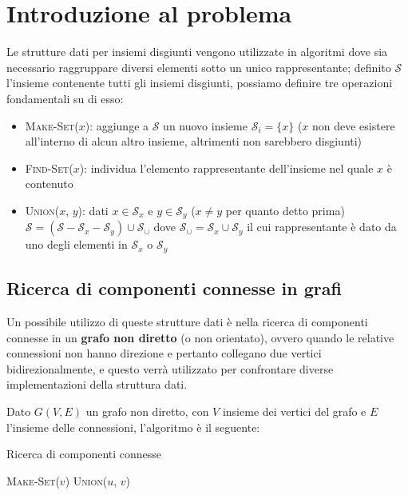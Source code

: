 \section{Introduzione al problema}

Le strutture dati per insiemi disgiunti vengono utilizzate in algoritmi
dove sia necessario raggruppare diversi elementi sotto un unico rappresentante;
definito $\mathcal{S}$ l'insieme contenente tutti gli insiemi disgiunti,
possiamo definire tre operazioni fondamentali su di esso:

\begin{itemize}
    \item \textsc{Make-Set($x$)}: aggiunge a $\mathcal{S}$ un nuovo insieme
          $\mathcal{S}_i = \{x\}$ ($x$ non deve esistere all'interno di alcun altro insieme,
          altrimenti non sarebbero disgiunti)
    \item \textsc{Find-Set($x$)}: individua l'elemento rappresentante dell'insieme nel quale $x$ è contenuto
    \item \textsc{Union($x$, $y$)}: dati $x \in \mathcal{S}_x$ e $y \in \mathcal{S}_y$
          ($x \ne y$ per quanto detto prima) $\mathcal{S} = (\mathcal{S} - \mathcal{S}_x - \mathcal{S}_y) \cup \mathcal{S}_\cup$
          dove $\mathcal{S}_\cup = \mathcal{S}_x \cup \mathcal{S}_y$ il cui rappresentante è
          dato da uno degli elementi in $\mathcal{S}_x$ o $\mathcal{S}_y$
\end{itemize}

\subsection{Ricerca di componenti connesse in grafi}

Un possibile utilizzo di queste strutture dati è nella ricerca di componenti
connesse in un \textbf{grafo non diretto} (o non orientato), ovvero quando le relative
connessioni non hanno direzione e pertanto collegano due vertici bidirezionalmente,
e questo verrà utilizzato per confrontare diverse implementazioni della
struttura dati.\newline

Dato $G(V,E)$ un grafo non diretto, con $V$ insieme dei vertici del grafo e $E$
l'insieme delle connessioni, l'algoritmo è il seguente:

\begin{algorithm}
    \caption{Ricerca di componenti connesse}\label{connectedComponentsAlg}
    \begin{algorithmic}[1]
         \label{alg:firstfor}
        \STATE \textsc{Make-Set($v$)}
        \ENDFOR
         \label{alg:secondfor}
        \STATE \textsc{Union($u$, $v$)}
        \ENDIF
        \ENDFOR
    \end{algorithmic}
\end{algorithm}


